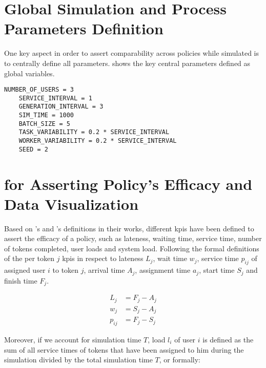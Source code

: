 
\section{Global Simulation and Process Parameters Definition}

One key aspect in order to assert comparability across policies while simulated is to centrally define all parameters.  shows the key central parameters defined as global variables.

\begin{lstlisting}[caption=Global parameters definition that ensures comparability across simulation runs,label=lst:central_parameters,style=CustomPython]
	NUMBER_OF_USERS = 3
	SERVICE_INTERVAL = 1
	GENERATION_INTERVAL = 3
	SIM_TIME = 1000
	BATCH_SIZE = 5
	TASK_VARIABILITY = 0.2 * SERVICE_INTERVAL
	WORKER_VARIABILITY = 0.2 * SERVICE_INTERVAL
	SEED = 2
\end{lstlisting}

\section{ for Asserting Policy's Efficacy and Data Visualization}

Based on \citet{Pinedo2008}'s and \citet{Zeng2005}'s definitions in their works, different \glspl{kpi} have been defined to assert the efficacy of a policy, such as lateness, waiting time, service time, number of tokens completed, user loads and system load. Following the formal definitions of the per token $j$ \glspl{kpi} in respect to lateness $L_j$, wait time $w_j$, service time $p_{ij}$ of assigned user $i$ to token $j$, arrival time $A_j$, assignment time $a_j$, start time $S_j$ and finish time $F_j$.

\begin{align}
	L_j&=F_j-A_j \label{eq:lateness}\\
	w_j&=S_j-A_j \\
	p_{ij}&=F_j-S_j
\end{align}

Moreover, if we account for simulation time $T$, load $l_i$ of user $i$ is defined as the sum of all service times of tokens that have been assigned to him during the simulation divided by the total simulation time $T$, or formally:

